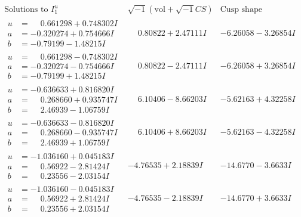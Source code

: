 \documentclass[1p]{elsarticle_modified}
\theoremstyle{definition}
\newcommand{\I}{\sqrt{-1}}
\begin{document}
$$\begin{array}{c|c|c}  
\text{Solutions to }I^u_{1}& \I (\text{vol} + \sqrt{-1}CS) & \text{Cusp shape}\\
 \hline 
\begin{aligned}
u &= \phantom{-}0.661298 + 0.748302 I \\
a &= -0.320274 + 0.754666 I \\
b &= -0.79199 - 1.48215 I\end{aligned}
 & \phantom{-}0.80822 + 2.47111 I & -6.26058 - 3.26854 I \\ \hline\begin{aligned}
u &= \phantom{-}0.661298 - 0.748302 I \\
a &= -0.320274 - 0.754666 I \\
b &= -0.79199 + 1.48215 I\end{aligned}
 & \phantom{-}0.80822 - 2.47111 I & -6.26058 + 3.26854 I \\ \hline\begin{aligned}
u &= -0.636633 + 0.816820 I \\
a &= \phantom{-}0.268660 + 0.935747 I \\
b &= \phantom{-}2.46939 - 1.06759 I\end{aligned}
 & \phantom{-}6.10406 - 8.66203 I & -5.62163 + 4.32258 I \\ \hline\begin{aligned}
u &= -0.636633 - 0.816820 I \\
a &= \phantom{-}0.268660 - 0.935747 I \\
b &= \phantom{-}2.46939 + 1.06759 I\end{aligned}
 & \phantom{-}6.10406 + 8.66203 I & -5.62163 - 4.32258 I \\ \hline\begin{aligned}
u &= -1.036160 + 0.045183 I \\
a &= \phantom{-}0.56922 - 2.81424 I \\
b &= \phantom{-}0.23556 - 2.03154 I\end{aligned}
 & -4.76535 + 2.18839 I & -14.6770 - 3.6633 I \\ \hline\begin{aligned}
u &= -1.036160 - 0.045183 I \\
a &= \phantom{-}0.56922 + 2.81424 I \\
b &= \phantom{-}0.23556 + 2.03154 I\end{aligned}
 & -4.76535 - 2.18839 I & -14.6770 + 3.6633 I \\ \hline\begin{aligned}

\end{aligned}
\end{array}$$
\end{document}
